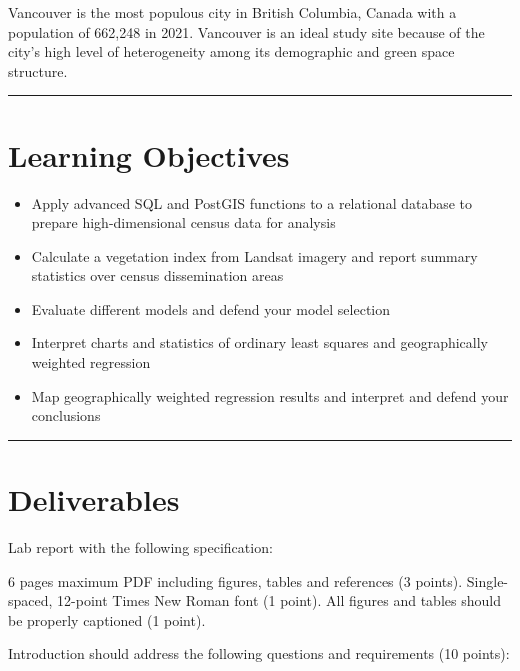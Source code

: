\documentclass[
]{book}
\begin{document}
Vancouver is the most populous city in British Columbia, Canada with a population of 662,248 in 2021. Vancouver is an ideal study site because of the city's high level of heterogeneity among its demographic and green space structure.

\begin{center}\rule{0.5\linewidth}{0.5pt}\end{center}

\hypertarget{learning-objectives-4}{%
\section*{Learning Objectives}\label{learning-objectives-4}}

\begin{itemize}
\item
  Apply advanced SQL and PostGIS functions to a relational database to prepare high-dimensional census data for analysis
\item
  Calculate a vegetation index from Landsat imagery and report summary statistics over census dissemination areas
\item
  Evaluate different models and defend your model selection
\item
  Interpret charts and statistics of ordinary least squares and geographically weighted regression
\item
  Map geographically weighted regression results and interpret and defend your conclusions
\end{itemize}

\begin{center}\rule{0.5\linewidth}{0.5pt}\end{center}

\hypertarget{lab5-deliverables}{%
\section*{Deliverables}\label{lab5-deliverables}}

Lab report with the following specification:

6 pages maximum PDF including figures, tables and references (3 points). Single-spaced, 12-point Times New Roman font (1 point). All figures and tables should be properly captioned (1 point).

Introduction should address the following questions and requirements (10 points):
\end{document}
